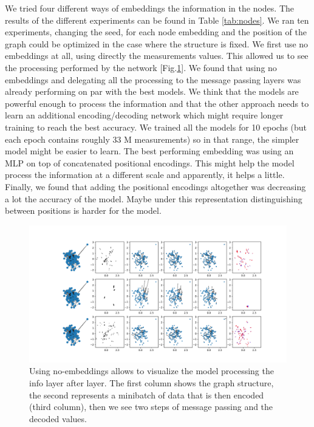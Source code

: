 \documentclass[a4paper,10pt]{article}
\begin{document}
We tried four different ways of embeddings the information in the nodes. The results of the different experiments can be found in Table \ref{tab:nodes}. We ran ten experiments, changing the seed, for each node embedding and the position of the graph could be optimized in the case where the structure is fixed. We first use no embeddings at all, using directly the measurements values. This allowed us to see the processing performed by the network [Fig.\ref{fig:processing}]. We found that using no embeddings and delegating all the processing to the message passing layers was already performing on par with the best models. We think that the models are powerful enough to process the information and that the other approach needs to learn an additional encoding/decoding network which might require longer training to reach the best accuracy. We trained all the models for 10 epochs (but each epoch contains roughly 33 M measurements) so in that range, the simpler model might be easier to learn. The best performing embedding was using an MLP on top of concatenated positional encodings. This might help the model process the information at a different scale and apparently, it helps a little. Finally, we found that adding the positional encodings altogether was decreasing a lot the accuracy of the model. Maybe under this representation distinguishing between positions is harder for the model.

\begin{figure}[htbp]
  \centering
  \includegraphics[width=\textwidth]{../results/pdfs/ba-100N-noemb0.pdf}
  \caption{Using no-embeddings allows to visualize the model processing the info layer after layer. The first column shows the graph structure, the second represents a minibatch of data that is then encoded (third column), then we see two steps of message passing and the decoded values.}
  \label{fig:processing}
\end{figure}
\end{document}
